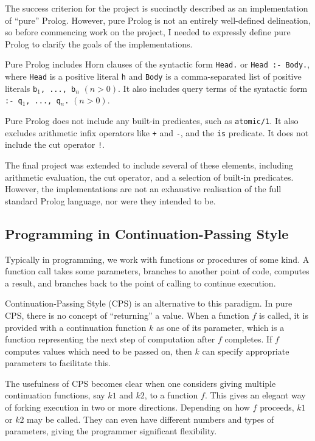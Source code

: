\documentclass[12pt]{article}
\begin{document}
The success criterion for the project is succinctly described as an implementation of ``pure'' Prolog. 
However, pure Prolog is not an entirely well-defined delineation, so before commencing work on the project, I needed to expressly define pure Prolog to clarify the goals of the implementations.

Pure Prolog includes Horn clauses of the syntactic form \verb|Head.| or \verb|Head :- Body.|, where \verb|Head| is a positive literal \verb|h| and \verb|Body| is a comma-separated list of positive literals \texttt{b$_1$, ..., b$_n$} $(n > 0)$. 
It also includes query terms of the syntactic form \texttt{:- q$_1$, ..., q$_n$.} $(n > 0)$.

Pure Prolog does not include any built-in predicates, such as \verb|atomic/1|. 
It also excludes arithmetic infix operators like \verb|+| and \verb|-|, and the \verb|is| predicate. 
It does not include the cut operator \verb|!|.

The final project was extended to include several of these elements, including arithmetic evaluation, the cut operator, and a selection of built-in predicates.
However, the implementations are not an exhaustive realisation of the full standard Prolog language, nor were they intended to be.

\subsection{Programming in Continuation-Passing Style}

Typically in programming, we work with functions or procedures of some kind. 
A function call takes some parameters, branches to another point of code, computes a result, and branches back to the point of calling to continue execution.

Continuation-Passing Style (CPS) is an alternative to this paradigm. 
In pure CPS, there is no concept of ``returning'' a value. 
When a function $f$ is called, it is provided with a continuation function $k$ as one of its parameter, which is a function representing the next step of computation after $f$ completes. 
If $f$ computes values which need to be passed on, then $k$ can specify appropriate parameters to facilitate this.

The usefulness of CPS becomes clear when one considers giving multiple continuation functions, say $k1$ and $k2$, to a function $f$. 
This gives an elegant way of forking execution in two or more directions. 
Depending on how $f$ proceeds, $k1$ or $k2$ may be called.
They can even have different numbers and types of parameters, giving the programmer significant flexibility.
\end{document}
